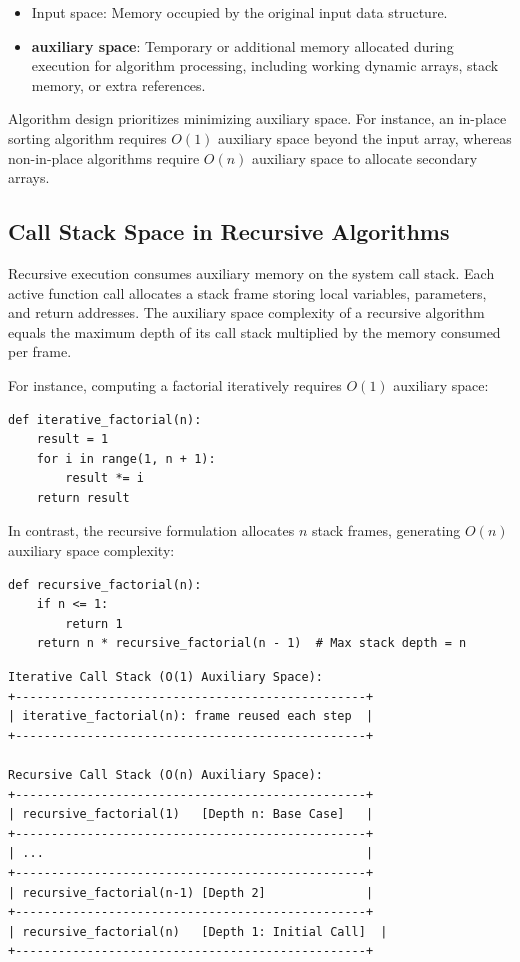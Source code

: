 \documentclass[12pt]{report}
\begin{document}
\begin{itemize}
    \item Input space: Memory occupied by the original input data structure.
    \item \textbf{auxiliary space}: Temporary or additional memory allocated during execution for algorithm processing, including working dynamic arrays, stack memory, or extra references.
\end{itemize}

Algorithm design prioritizes minimizing auxiliary space. For instance, an in-place sorting algorithm requires $O(1)$ auxiliary space beyond the input array, whereas non-in-place algorithms require $O(n)$ auxiliary space to allocate secondary arrays.

\subsection{Call Stack Space in Recursive Algorithms}

Recursive execution consumes auxiliary memory on the system call stack. Each active function call allocates a stack frame storing local variables, parameters, and return addresses. The auxiliary space complexity of a recursive algorithm equals the maximum depth of its call stack multiplied by the memory consumed per frame.

For instance, computing a factorial iteratively requires $O(1)$ auxiliary space:

\begin{verbatim}
def iterative_factorial(n):
    result = 1
    for i in range(1, n + 1):
        result *= i
    return result
\end{verbatim}

In contrast, the recursive formulation allocates $n$ stack frames, generating $O(n)$ auxiliary space complexity:

\begin{verbatim}
def recursive_factorial(n):
    if n <= 1:
        return 1
    return n * recursive_factorial(n - 1)  # Max stack depth = n
\end{verbatim}

\begin{verbatim}
Iterative Call Stack (O(1) Auxiliary Space):
+-------------------------------------------------+
| iterative_factorial(n): frame reused each step  |
+-------------------------------------------------+

Recursive Call Stack (O(n) Auxiliary Space):
+-------------------------------------------------+
| recursive_factorial(1)   [Depth n: Base Case]   |
+-------------------------------------------------+
| ...                                             |
+-------------------------------------------------+
| recursive_factorial(n-1) [Depth 2]              |
+-------------------------------------------------+
| recursive_factorial(n)   [Depth 1: Initial Call]  |
+-------------------------------------------------+
\end{verbatim}
\end{document}
